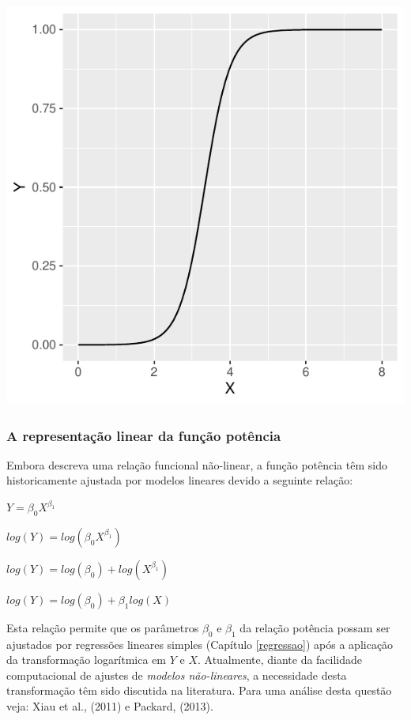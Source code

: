 \documentclass[
]{book}
\begin{document}
\begin{center}\includegraphics{probest-cambientais_files/figure-latex/unnamed-chunk-222-1} \end{center}

\hypertarget{a-representauxe7uxe3o-linear-da-funuxe7uxe3o-potuxeancia}{%
\subsubsection*{A representação linear da função potência}\label{a-representauxe7uxe3o-linear-da-funuxe7uxe3o-potuxeancia}}

Embora descreva uma relação funcional não-linear, a função potência têm sido historicamente ajustada por modelos lineares devido a seguinte relação:

\(Y = \beta_{0}X^{\beta_{1}}\)

\(log(Y) = log(\beta_{0}X^{\beta_{1}})\)

\(log(Y) = log(\beta_{0}) + log(X^{\beta_{1}})\)

\(log(Y) = log(\beta_{0}) + \beta_{1}log(X)\)

Esta relação permite que os parâmetros \(\beta_0\) e \(\beta_1\) da relação potência possam ser ajustados por regressões lineares simples (Capítulo \ref{regressao}) após a aplicação da transformação logarítmica em \(Y\) e \(X\). Atualmente, diante da facilidade computacional de ajustes de \emph{modelos não-lineares}, a necessidade desta transformação têm sido discutida na literatura. Para uma análise desta questão veja: Xiau et al., (2011) e Packard, (2013).
\end{document}

